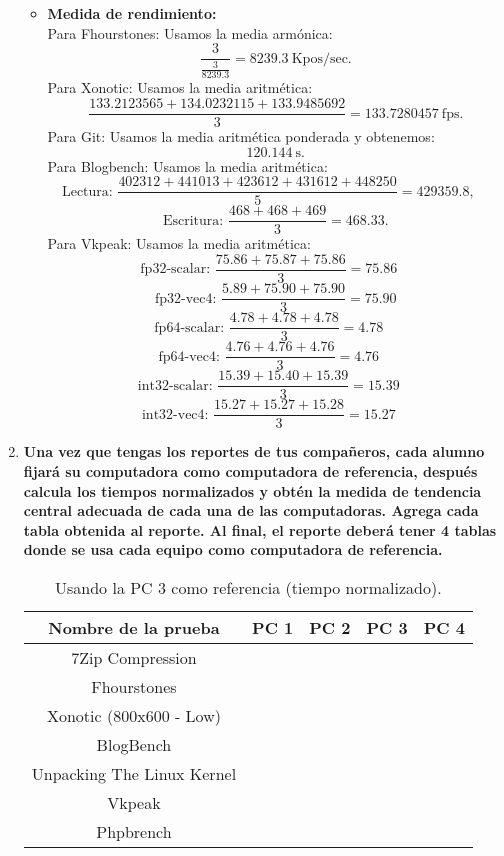 \documentclass[12pt]{article}
\newcommand{\pl}[1]{\item \textbf{ #1 }}
\begin{document}
\begin{enumerate}[label=(\arabic{section}.\arabic{subsection}.\arabic{enumi})]
\begin{itemize}
       \item \textbf{Medida de rendimiento:} \\
       Para Fhourstones: Usamos la media armónica:
       \[
       \frac{3}{\frac{3}{8239.3}} = 8239.3\ \text{Kpos/sec}.
       \]
       Para Xonotic: Usamos la media aritmética:
       \[
       \frac{133.2123565+134.0232115+133.9485692}{3}=133.7280457\ \text{fps}.
       \]
       Para Git: Usamos la media aritmética ponderada y obtenemos:
       \[
       120.144\ \text{s}.
       \]
       Para Blogbench: Usamos la media aritmética:
       \[
       \text{Lectura: } \frac{402312+441013+423612+431612+448250}{5}=429359.8,\quad
       \]
       \[
       \text{Escritura: } \frac{468+468+469}{3}=468.33.
       \]
       	Para Vkpeak: Usamos la media aritmética:
       	\[
       	\text{fp32-scalar: } \frac{75.86+75.87+75.86}{3}=75.86 \quad
       	\]
       	\[
       	\text{fp32-vec4: } \frac{5.89+75.90+75.90}{3}=75.90 
       	\]
       	\[
       	\text{fp64-scalar: } \frac{4.78+4.78+4.78}{3}=4.78 \quad
       	\]
       	\[
       	\text{fp64-vec4: } \frac{4.76+4.76+4.76}{3}=4.76 \quad
       	\]
       	\[
       	\text{int32-scalar: } \frac{15.39+15.40+15.39}{3}=15.39 \quad
       	\]
       	\[
       	\text{int32-vec4: } \frac{15.27+15.27+15.28}{3}=15.27 \quad
       	\]
       \end{itemize}

    \pl{Una vez que tengas los reportes de tus compañeros, cada alumno fijará su computadora como computadora de referencia, después calcula los tiempos normalizados y obtén la medida de tendencia central adecuada de cada una de las computadoras. Agrega cada tabla obtenida al reporte. Al final, el reporte deberá tener 4 tablas donde se usa cada equipo como computadora de referencia.}

    \begin{table}[htb]
        \centering
        \begin{tabular}{|c|c|c|c|c|}
        \hline
        \textbf{Nombre de la prueba} & \textbf{PC 1} & \textbf{PC 2} & \textbf{PC 3} & \textbf{PC 4}\\
        \hline
        7Zip Compression & & & & \\
        \hline
        Fhourstones & & & & \\
        \hline
        Xonotic (800x600 - Low) & & & &  \\
        \hline
        BlogBench & & & &  \\
        \hline
        Unpacking The Linux Kernel & & & & \\
        \hline
        Vkpeak & & & & \\
        \hline
        Phpbrench & & & & \\
        \end{tabular}
        \caption{Usando la PC 3 como referencia (tiempo normalizado).}
    \end{table}


\end{enumerate}
\end{document}
